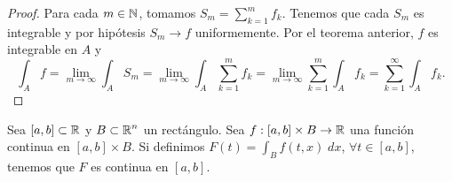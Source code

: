 \begin{proof}
Para cada $\displaystyle m \in \mathbb{N} $, tomamos $\displaystyle S_{m}=\sum^{m}_{k=1}f_{k} $. Tenemos que cada $\displaystyle S_{m} $ es integrable y por hipótesis $\displaystyle S_{m}\to f $ uniformemente. Por el teorema anterior, $\displaystyle f $ es integrable en $\displaystyle A $ y
\[\int _{A}f =\lim_{m \to \infty}\int _{A}S_{m} =\lim_{m \to \infty}\int _{A}\sum^{m}_{k = 1}f_{k}=\lim_{m \to \infty}\sum^{m}_{k = 1}\int _{A}f_{k} =\sum^{\infty}_{k=1}\int _{A}f_{k} .\]
\end{proof}
\begin{theorem}
	Sea $\displaystyle \left[a,b\right] \subset \mathbb{R} $ y $\displaystyle B \subset \mathbb{R}^{n} $ un rectángulo. Sea $\displaystyle f : \left[a,b\right] \times B\to \mathbb{R} $ una función continua en $\displaystyle \left[a,b\right] \times B $. Si definimos $\displaystyle F\left(t\right)=\int _{B}f\left(t,x\right) \; dx $, $\displaystyle \forall t \in \left[a,b\right]  $, tenemos que $\displaystyle F $ es continua en $\displaystyle \left[a,b\right]  $. 
\end{theorem}

